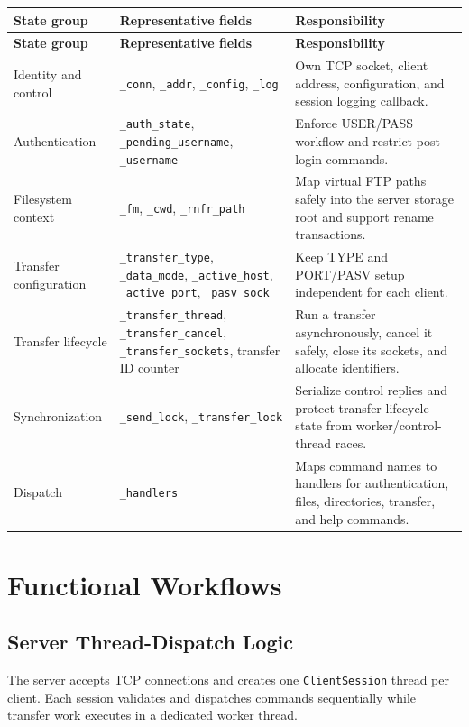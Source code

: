 \documentclass[11pt,a4paper]{article}
\newcommand{\code}[1]{\texttt{#1}}
\begin{document}
\begin{longtable}{@{}P{30mm}P{38mm}P{79mm}@{}}
\toprule
\textbf{State group} & \textbf{Representative fields} & \textbf{Responsibility} \\
\midrule
\endfirsthead
\toprule
\textbf{State group} & \textbf{Representative fields} & \textbf{Responsibility} \\
\midrule
\endhead
Identity and control & \code{\_conn}, \code{\_addr}, \code{\_config}, \code{\_log} & Own TCP socket, client address, configuration, and session logging callback. \\
Authentication & \code{\_auth\_state}, \code{\_pending\_username}, \code{\_username} & Enforce USER/PASS workflow and restrict post-login commands. \\
Filesystem context & \code{\_fm}, \code{\_cwd}, \code{\_rnfr\_path} & Map virtual FTP paths safely into the server storage root and support rename transactions. \\
Transfer configuration & \code{\_transfer\_type}, \code{\_data\_mode}, \code{\_active\_host}, \code{\_active\_port}, \code{\_pasv\_sock} & Keep TYPE and PORT/PASV setup independent for each client. \\
Transfer lifecycle & \code{\_transfer\_thread}, \code{\_transfer\_cancel}, \code{\_transfer\_sockets}, transfer ID counter & Run a transfer asynchronously, cancel it safely, close its sockets, and allocate identifiers. \\
Synchronization & \code{\_send\_lock}, \code{\_transfer\_lock} & Serialize control replies and protect transfer lifecycle state from worker/control-thread races. \\
Dispatch & \code{\_handlers} & Maps command names to handlers for authentication, files, directories, transfer, and help commands. \\
\bottomrule
\end{longtable}

\section{Functional Workflows}

\subsection{Server Thread-Dispatch Logic}

The server accepts TCP connections and creates one \code{ClientSession} thread per client. Each session validates and dispatches commands sequentially while transfer work executes in a dedicated worker thread.
\end{document}
